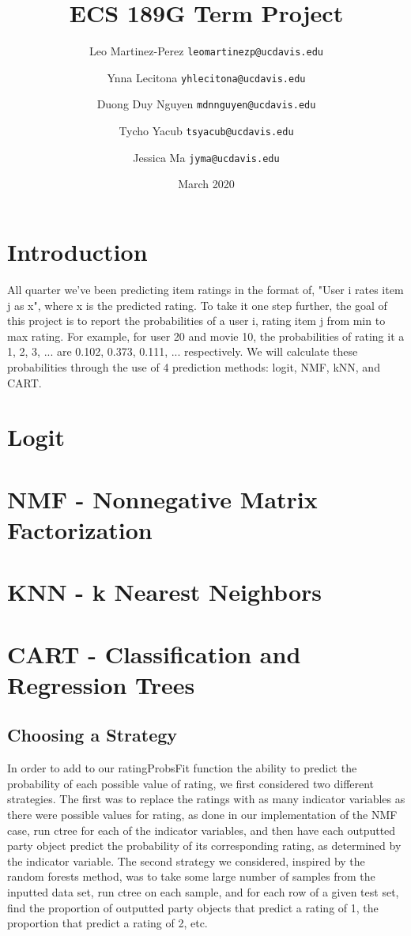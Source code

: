 \documentclass{article}
\title{ECS 189G Term Project}
\author{Leo Martinez-Perez
    \texttt{leomartinezp@ucdavis.edu}
    \and Ynna Lecitona
    \texttt{yhlecitona@ucdavis.edu}
    \and Duong Duy Nguyen
    \texttt{mdnnguyen@ucdavis.edu}
    \and Tycho Yacub
    \texttt{tsyacub@ucdavis.edu}
    \and Jessica Ma
    \texttt{jyma@ucdavis.edu}
}
\date{March 2020}
\begin{document}
\maketitle

\section{Introduction}
All quarter we've been predicting item ratings in the format of, "User i rates item j as x", where x is the predicted rating. To take it one step further, the goal of this project is to report the probabilities of a user i, rating item j from min to max rating. For example, for user 20 and movie 10, the probabilities of rating it a 1, 2, 3, ... are 0.102, 0.373, 0.111, ... respectively. We will calculate these probabilities through the use of 4 prediction methods: logit, NMF, kNN, and CART.

\section{Logit}

\section{NMF - Nonnegative Matrix Factorization}

\section{KNN - k Nearest Neighbors}

\section{CART - Classification and Regression Trees}
\subsection{Choosing a Strategy}
In order to add to our ratingProbsFit function the ability to predict the probability of each possible value of rating, we first considered two different strategies. The first was to replace the ratings with as many indicator variables as there were possible values for rating, as done in our implementation of the NMF case, run ctree for each of the indicator variables, and then have each outputted party object predict the probability of its corresponding rating, as determined by the indicator variable. The second strategy we considered, inspired by the random forests method, was to take some large number of samples from the inputted data set, run ctree on each sample, and for each row of a given test set, find the proportion of outputted party objects that predict a rating of 1, the proportion that predict a rating of 2, etc.
\end{document}
